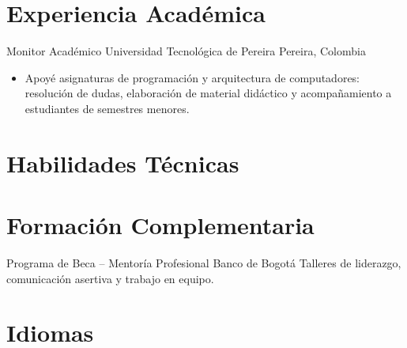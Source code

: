 \documentclass[11pt,a4paper,sans]{moderncv}
\begin{document}
\section{Experiencia Académica}

  {Monitor Académico}
  {Universidad Tecnológica de Pereira}
  {Pereira, Colombia}
  {}
  {\begin{itemize}
     \item Apoyé asignaturas de programación y arquitectura de
           computadores: resolución de dudas, elaboración de material
           didáctico y acompañamiento a estudiantes de semestres menores.
   \end{itemize}}

\section{Habilidades Técnicas}


\section{Formación Complementaria}

  {Programa de Beca -- Mentoría Profesional}
  {Banco de Bogotá}
  {}{}
  {Talleres de liderazgo, comunicación asertiva y trabajo en equipo.}

\section{Idiomas}

\end{document}
